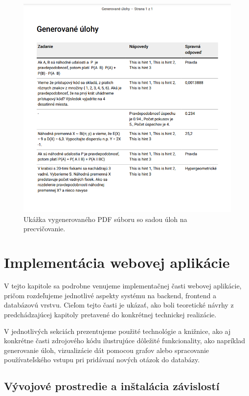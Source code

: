 \begin{figure}[h!]
  \centering
  \includegraphics[width=14cm]{img/pdf.png}
  \caption{Ukážka vygenerovaného PDF súboru so sadou úloh na precvičovanie.}
  \label{pdf-export}
\end{figure}


 \section{Implementácia webovej aplikácie}
 V tejto kapitole sa podrobne venujeme implementačnej časti webovej aplikácie, pričom rozdeľujeme jednotlivé aspekty systému na backend, frontend a databázovú vrstvu.
  Cieľom tejto časti je ukázať, ako boli teoretické návrhy z predchádzajúcej kapitoly pretavené do konkrétnej technickej realizácie.

 V jednotlivých sekciách prezentujeme použité technológie a knižnice, ako aj konkrétne časti zdrojového kódu ilustrujúce dôležité funkcionality, 
 ako napríklad generovanie úloh, vizualizácie dát pomocou grafov alebo spracovanie používateľského vstupu pri pridávaní nových otázok do databázy.

 \subsection{Vývojové prostredie a inštalácia závislostí}

